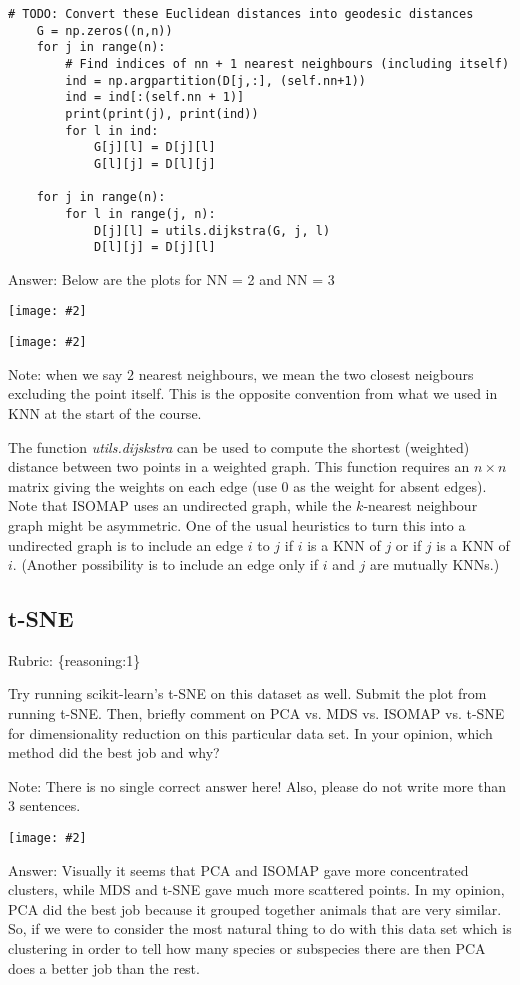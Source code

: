 \documentclass{article}
\def\rubric#1{\gre{Rubric: \{#1\}}}{}
\def\blu#1{{\color{blu}#1}}
\def\gre#1{{\color{gre}#1}}
\def\ans#1{\gre{Answer: #1}}{}
\newcommand{\centerfig}[2]{\begin{center}\texttt{[image: \#2]}\end{center}}
\begin{document}
\begin{lstlisting}[style=base]
	# TODO: Convert these Euclidean distances into geodesic distances
	G = np.zeros((n,n))
	for j in range(n):
		# Find indices of nn + 1 nearest neighbours (including itself)
		ind = np.argpartition(D[j,:], (self.nn+1))
		ind = ind[:(self.nn + 1)]
		print(print(j), print(ind))
		for l in ind:
			G[j][l] = D[j][l]
			G[l][j] = D[l][j]
	
	for j in range(n):
		for l in range(j, n):
			D[j][l] = utils.dijkstra(G, j, l)
			D[l][j] = D[j][l]
\end{lstlisting}

\ans{Below are the plots for NN = 2 and NN = 3}
\centerfig{.5}{../figs/ISOMAP2_animals.png}
\centerfig{.5}{../figs/ISOMAP3_animals.png}
Note: when we say $2$ nearest neighbours, we mean the two closest neigbours excluding the point itself. This is the opposite convention from what we used in KNN at the start of the course.

The function \emph{utils.dijskstra} can be used to compute the shortest (weighted) distance between two points in a weighted graph.
This function requires an $n \times n$ matrix giving the weights on each edge (use $0$ as the weight for absent edges).
Note that ISOMAP uses an undirected graph, while the $k$-nearest neighbour graph might be asymmetric.
One of the usual heuristics to turn this into a undirected graph is to include an edge $i$ to $j$ if $i$ is a KNN of $j$ or if $j$ is a KNN of $i$.
(Another possibility is to include an edge only if $i$ and $j$ are mutually KNNs.)



\subsection{t-SNE}
\rubric{reasoning:1}

Try running scikit-learn's t-SNE on this dataset as well. \blu{Submit the plot from running t-SNE. Then, briefly comment on PCA vs. MDS vs. ISOMAP vs. t-SNE for dimensionality reduction on this particular data set. In your opinion, which method did the best job and why?}

Note: There is no single correct answer here! Also, please do not write more than 3 sentences.
\centerfig{.5}{../figs/t-SNE_animals.png}
\ans{Visually it seems that PCA and ISOMAP gave more concentrated clusters, while MDS and t-SNE gave much more scattered points. In my opinion, PCA did the best job because it grouped together animals that are very similar. So, if we were to consider the most natural thing to do with this data set which is clustering in order to tell how many species or subspecies there are then PCA does a better job than the rest. }
\end{document}
